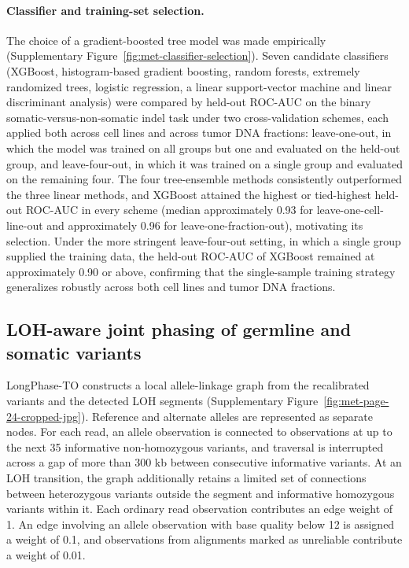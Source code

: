 \documentclass[pdflatex,sn-nature]{sn-jnl}
\begin{document}
\paragraph{Classifier and training-set selection.} The choice of a gradient-boosted tree model was made empirically (Supplementary Figure~\ref{fig:met-classifier-selection}). Seven candidate classifiers (XGBoost, histogram-based gradient boosting, random forests, extremely randomized trees, logistic regression, a linear support-vector machine and linear discriminant analysis) were compared by held-out ROC-AUC on the binary somatic-versus-non-somatic indel task under two cross-validation schemes, each applied both across cell lines and across tumor DNA fractions: leave-one-out, in which the model was trained on all groups but one and evaluated on the held-out group, and leave-four-out, in which it was trained on a single group and evaluated on the remaining four. The four tree-ensemble methods consistently outperformed the three linear methods, and XGBoost attained the highest or tied-highest held-out ROC-AUC in every scheme (median approximately 0.93 for leave-one-cell-line-out and approximately 0.96 for leave-one-fraction-out), motivating its selection. Under the more stringent leave-four-out setting, in which a single group supplied the training data, the held-out ROC-AUC of XGBoost remained at approximately 0.90 or above, confirming that the single-sample training strategy generalizes robustly across both cell lines and tumor DNA fractions.


\subsection{LOH-aware joint phasing of germline and somatic variants}
\label{supp:loh-aware-phasing}

LongPhase-TO constructs a local allele-linkage graph from the recalibrated variants and the detected LOH segments (Supplementary Figure~\ref{fig:met-page-24-cropped-jpg}). Reference and alternate alleles are represented as separate nodes. For each read, an allele observation is connected to observations at up to the next 35 informative non-homozygous variants, and traversal is interrupted across a gap of more than 300 kb between consecutive informative variants. At an LOH transition, the graph additionally retains a limited set of connections between heterozygous variants outside the segment and informative homozygous variants within it. Each ordinary read observation contributes an edge weight of 1. An edge involving an allele observation with base quality below 12 is assigned a weight of 0.1, and observations from alignments marked as unreliable contribute a weight of 0.01.
\end{document}
